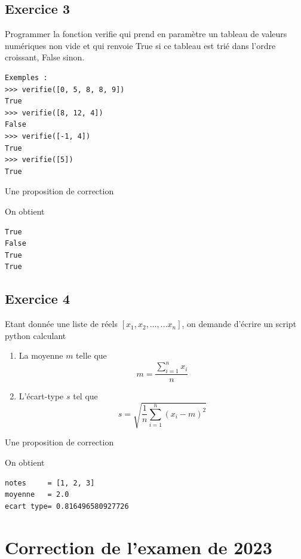 \documentclass[a4paper,12pt]{article}
\begin{document}
\clearpage

\subsection{Exercice 3}
\begin{leftbar}
Programmer la fonction verifie qui prend en param\`etre un tableau de valeurs num\'eriques non
vide et qui renvoie True si ce tableau est tri\'e dans l'ordre croissant, False sinon.
\end{leftbar}
\begin{verbatim}
Exemples :
>>> verifie([0, 5, 8, 8, 9])
True
>>> verifie([8, 12, 4])
False
>>> verifie([-1, 4])
True
>>> verifie([5])
True
\end{verbatim}

Une proposition de correction

On obtient
\begin{verbatim}
True
False
True
True
\end{verbatim}
\clearpage
\subsection{Exercice 4}
\begin{leftbar}
Etant donn\'ee une liste de r\'eels $[x_1, x_2,\ldots, ...x_n]$, on demande d'\'ecrire un script python calculant

\begin{enumerate}
\item La moyenne $m$ telle que
\begin{equation*}
m=\displaystyle\frac{\sum\limits_{i=1}^n x_i}{n}
\end{equation*}
\item L'\'ecart-type $s$ tel que 
\begin{equation*}
s=\displaystyle\sqrt{\frac{1}{n}\sum_{i=1}^n \left(x_i-m\right)^2}
\end{equation*}
\end{enumerate}
\end{leftbar}
Une proposition de correction

On obtient
\begin{verbatim}
notes     = [1, 2, 3]
moyenne   = 2.0
ecart type= 0.816496580927726
\end{verbatim}




\clearpage
\section{Correction de l’examen de 2023}
\end{document}
